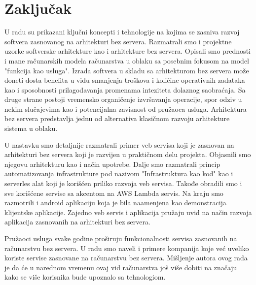 \documentclass[12pt,oneside]{memoir}
\begin{document}
\chapter{Zaključak}

U radu su prikazani ključni koncepti i tehnologije na kojima se zasniva razvoj softvera zasnovanog na arhitekturi bez servera. Razmatrali smo i projektne uzorke softverske arhitekture kao i arhitekture bez servera. Opisali smo prednosti i mane računarskih modela računarstva u oblaku sa posebnim fokusom na model "funkcija kao usluga". Izrada softvera u skladu sa arhitekturom bez servera može doneti dosta benefita u vidu smanjenja troškova i količine operativnih zadataka kao i sposobnosti prilagođavanja promenama inteziteta dolaznog saobraćaja. Sa druge strane postoji vremensko organičenje izvršavanja operacije, spor odziv u nekim slučajevima kao i potencijalna zavisnost od pružaoca usluga. Arhitektura bez servera predstavlja jednu od alternativa klasičnom razvoju arhitekture sistema u oblaku.

U nastavku smo detaljnije razmatrali primer veb servisa koji je zasnovan na arhitekturi bez servera koji je razvijen u praktičnom delu projekta. Objasnili smo njegovu arhitekturu kao i način upotrebe. Dalje smo razmatrali princip automatizovanja infrastrukture pod nazivom "Infrastruktura kao kod" kao i serverles alat koji je korišćen priliko razvoja veb servisa. Takođe obradili smo i sve korišćene servise sa akcentom na AWS Lambda servis. Na kraju smo razmotrili i android aplikaciju koja je bila naamenjena kao demonstracija klijentske aplikacije. Zajedno veb servis i aplikacija pružaju uvid na način razvoja aplikacija zasnovanih na arhitekturi bez servera. 

Pružaoci usluga svake godine proširuju funkcionalnosti servisa zasnovanih na računarstvu bez servera. U radu smo naveli i primere kompanija koje već uveliko koriste servise zasnovane na računarstvu bez servera. Mišljenje autora ovog rada je da će u narednom vremenu ovaj vid računarstva još više dobiti na značaju kako se više korisnika bude upoznalo sa tehnologiom.

\literatura

\backmatter
\end{document}
